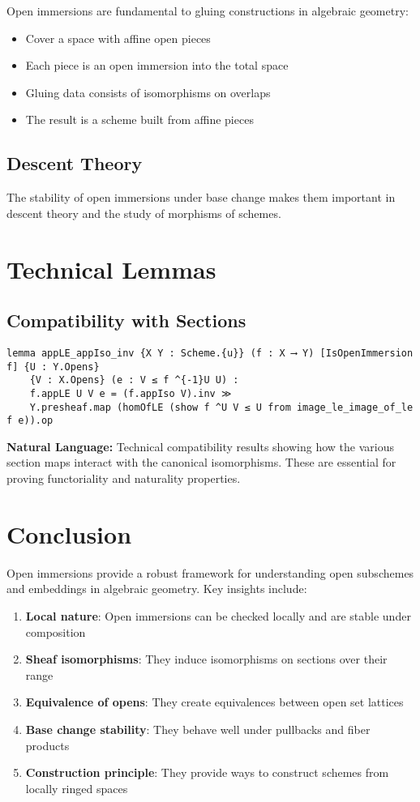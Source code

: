 \documentclass{article}
\theoremstyle{definition}
\begin{document}
Open immersions are fundamental to gluing constructions in algebraic geometry:
\begin{itemize}
\item Cover a space with affine open pieces
\item Each piece is an open immersion into the total space
\item Gluing data consists of isomorphisms on overlaps
\item The result is a scheme built from affine pieces
\end{itemize}

\subsection{Descent Theory}

The stability of open immersions under base change makes them important in descent theory and the study of morphisms of schemes.

\section{Technical Lemmas}

\subsection{Compatibility with Sections}

\begin{lstlisting}
lemma appLE_appIso_inv {X Y : Scheme.{u}} (f : X ⟶ Y) [IsOpenImmersion f] {U : Y.Opens}
    {V : X.Opens} (e : V ≤ f ^{-1}U U) :
    f.appLE U V e = (f.appIso V).inv ≫ 
    Y.presheaf.map (homOfLE (show f ^U V ≤ U from image_le_image_of_le f e)).op
\end{lstlisting}

\textbf{Natural Language:} Technical compatibility results showing how the various section maps interact with the canonical isomorphisms. These are essential for proving functoriality and naturality properties.

\section{Conclusion}

Open immersions provide a robust framework for understanding open subschemes and embeddings in algebraic geometry. Key insights include:

\begin{enumerate}
\item \textbf{Local nature}: Open immersions can be checked locally and are stable under composition
\item \textbf{Sheaf isomorphisms}: They induce isomorphisms on sections over their range
\item \textbf{Equivalence of opens}: They create equivalences between open set lattices  
\item \textbf{Base change stability}: They behave well under pullbacks and fiber products
\item \textbf{Construction principle}: They provide ways to construct schemes from locally ringed spaces
\end{enumerate}
\end{document}
